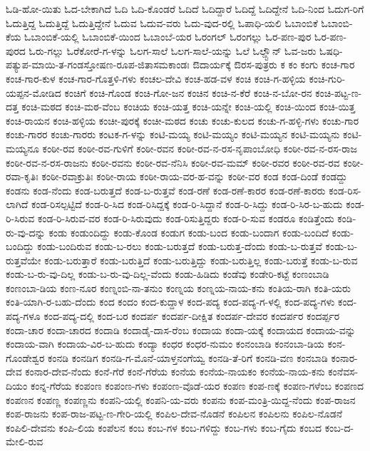 ಓಡಿ-ಹೋ-ಯಿತು
ಓದ-ಬೇಕಾಗಿದೆ
ಓದಿ
ಓದಿ-ಕೊಂಡರೆ
ಓದಿದೆ
ಓದಿದ್ದಾರೆ
ಓದಿದ್ದೆ
ಓದಿದ್ದೇನೆ
ಓದಿ-ನಿಂದ
ಓದುಗ-ರಿಗೆ
ಓದುತ್ತಿದ್ದ
ಓದುತ್ತಿದ್ದೆ
ಓದುತ್ತಿದ್ದೇನೆ
ಓದುವ
ಓದುವ-ವರು
ಓದು-ವುದ-ರಲ್ಲಿ
ಓಪಾಧಿ-ಯಲಿ
ಓಬಾಂಬಿಕೆ
ಓಬಾಂಬಿ-ಕೆಯ
ಓಬಾಂಬಿಕೆ-ಯಲ್ಲಿ
ಓಬಾಂಬಿಕೆ-ಯಿಂದ
ಓಬಾಂಬೆ-ಯರ
ಓರಂಗಲ್
ಓರಂಗಲ್ಲು
ಓರ-ಪಣ-ಪುರ
ಓರ-ಪಣ-ಪುರದ
ಓರು-ಗಲ್ಲು
ಓರೆಕೋರೆ-ಗ-ಳನ್ನು
ಓಲಗ-ಸಾಲೆ
ಓಲಗ-ಸಾಲೆ-ಯನ್ನು
ಓಲೆ
ಓಲ್ಡ್ಟೌನ್
ಓವ-ಜರು
ಓಷಧಿ-ಪತ್ಯುಪ-ಮಾಯಿ-ತ-ಗಂಡಸ್ತೋಷಣ-ರೂಪ-ಜಿತಾಸಮಕಾಂಡಃ
ಔದಾರ್ಯಕ್ಕೆ
ಔರಸ-ಪುತ್ರರು
ಕ
ಕಂ
ಕಂಗು
ಕಂಚ-ಗಾರ
ಕಂಚ-ಗಾರ-ಕುಳ
ಕಂಚ-ಗಾರ-ಗೊತ್ತಳಿ-ಗಳು
ಕಂಚಲ-ದೇವಿ
ಕಂಚ-ಹಡ-ವಳ
ಕಂಚಿ
ಕಂಚಿ-ಗ-ಹಳ್ಳಿಯ
ಕಂಚಿ-ಗುರಿ-ಯಪ್ಪನ-ಮೋಡಿದ
ಕಂಚಿಗೆ
ಕಂಚಿ-ಗೊಂಡ
ಕಂಚಿ-ಗೋ-ಜನ
ಕಂಚಿನ
ಕಂಚಿ-ನ-ಕೆರೆ
ಕಂಚಿ-ನ-ಬೋ-ರನ
ಕಂಚಿ-ಪಟ್ಟ-ಣ-ದತ್ತ
ಕಂಚಿ-ಮಠದ
ಕಂಚಿ-ಮಠ-ವೆಂಬ
ಕಂಚಿಯ
ಕಂಚಿ-ಯತ್ತ
ಕಂಚಿ-ಯನ್ನೇ
ಕಂಚಿ-ಯಲ್ಲಿ
ಕಂಚಿ-ಯಿಂದ
ಕಂಚಿ-ಯಿತ್ತ
ಕಂಚಿ-ರಾಯನ
ಕಂಚಿ-ಹಳ್ಳಿಯ
ಕಂಚೀ-ಪುರಕ್ಕೆ
ಕಂಚೀ-ಮಠದ
ಕಂಚು
ಕಂಚು-ಕುಲದ
ಕಂಚು-ಗ-ಹಳ್ಳಿ-ಗಳು
ಕಂಚು-ಗಾರ
ಕಂಚು-ಗಾರರ
ಕಂಚು-ಗಾರರು
ಕಂಟಕ-ಗ-ಳನ್ನು
ಕಂಟಿ-ಮಯ್ಯ
ಕಂಟಿ-ಮಯ್ಯಂ
ಕಂಟಿ-ಮಯ್ಯನ
ಕಂಟಿ-ಮಯ್ಯನು
ಕಂಟಿ-ಮಯ್ಯನೂ
ಕಂಠೀ-ರವ
ಕಂಠೀ-ರವ-ಗುಳಿಗೆ
ಕಂಠೀ-ರವನ
ಕಂಠೀ-ರವ-ನ-ರಸ-ನೃಪಾಂಬೋಧಿ
ಕಂಠೀ-ರವ-ನ-ರಸ-ರಾಜ
ಕಂಠೀ-ರವ-ನ-ರಸ-ರಾಜನು
ಕಂಠೀ-ರವನು
ಕಂಠೀ-ರವ-ನೆನಿಸಿ
ಕಂಠೀ-ರವ-ಮಮ್
ಕಂಠೀ-ರವರ
ಕಂಠೀ-ರವ-ರವ
ಕಂಠೀ-ರವಾ-ಕೃತಿಃ
ಕಂಠೀ-ರವಾಕ್ರುತಿಃ
ಕಂಠೀ-ರಾಯ
ಕಂಠೀ-ರಾಯ-ವರ-ಹ-ವನ್ನು
ಕಂಠೀ-ವರ
ಕಂಡ
ಕಂಡ-ದಿಂಡೆ
ಕಂಡದ್ದು
ಕಂಡನು
ಕಂಡ-ನೆಂದು
ಕಂಡ-ಬರುತ್ತದೆ
ಕಂಡ-ಬ-ರುತ್ತವೆ
ಕಂಡ-ರಣೆ
ಕಂಡ-ರಣೆ-ಕಾರರ
ಕಂಡ-ರಣೆ-ಕಾರರು
ಕಂಡ-ರಿಸ-ಲಾಗಿದೆ
ಕಂಡ-ರಿಸಲ್ಪಟ್ಟಿದೆ
ಕಂಡ-ರಿ-ಸಿದ
ಕಂಡ-ರಿಸಿದ್ದಕ್ಕೆ
ಕಂಡ-ರಿ-ಸಿದ್ದಾನೆ
ಕಂಡ-ರಿ-ಸಿದ್ದು
ಕಂಡ-ರಿ-ಸಿರ-ಬ-ಹುದು
ಕಂಡ-ರಿ-ಸಿರುವ
ಕಂಡ-ರಿ-ಸಿರುವ-ವರ
ಕಂಡ-ರಿ-ಸಿರುವುದು
ಕಂಡ-ರಿಸುತ್ತಿದ್ದರು
ಕಂಡ-ರಿ-ಸುವ
ಕಂಡರೂ
ಕಂಡಿತ್ತೆಂದು
ಕಂಡಿ-ರು-ವು-ದನ್ನು
ಕಂಡು
ಕಂಡುಂದಿದ್ದು
ಕಂಡು-ಕೊಂಡ
ಕಂಡುಗ
ಕಂಡು-ಬಂದ
ಕಂಡು-ಬಂದಾಗ
ಕಂಡು-ಬಂದಿದೆ
ಕಂಡು-ಬಂದಿದ್ದು
ಕಂಡು-ಬಂದಿರುವ
ಕಂಡು-ಬ-ರಲು
ಕಂಡು-ಬರುತ್ತದೆ
ಕಂಡು-ಬರುತ್ತ-ದೆಂದು
ಕಂಡು-ಬ-ರುತ್ತವೆ
ಕಂಡು-ಬ-ರುತ್ತವೆಯೇ
ಕಂಡು-ಬರುತ್ತಾರೆ
ಕಂಡು-ಬರುತ್ತಿದೆ
ಕಂಡು-ಬರುತ್ತಿದ್ದು
ಕಂಡು-ಬರುತ್ತಿಲ್ಲ
ಕಂಡು-ಬರುತ್ತೆ
ಕಂಡು-ಬ-ರುವ
ಕಂಡು-ಬ-ರು-ವು-ದಿಲ್ಲ
ಕಂಡು-ಬ-ರು-ವು-ದಿಲ್ಲ-ವೆಂದು
ಕಂಡು-ಹಿಡಿದು
ಕಂಡೆವು
ಕಂಡೇರಿ-ಕಟ್ಟೆ
ಕಂಣಂಬಾಡಿ
ಕಂಣಂಬಾ-ಡಿಯ
ಕಂಣ-ನೂರ
ಕಂಣ್ನಂಬಿ-ನಾ-ತನುಂ
ಕಂಣ್ನಯ
ಕಂಣ್ನಯ-ನಾಯ-ಕನು
ಕಂತಿಯ-ರಾಗಿ
ಕಂತಿ-ಯರು
ಕಂತಿ-ಯಾಗಿ-ರ-ಬಹು-ದೆಂದು
ಕಂದ
ಕಂದಂ
ಕಂದ-ಕುದ್ದಾಳ
ಕಂದ-ಪದ್ಯ
ಕಂದ-ಪದ್ಯ-ಗ-ಳಲ್ಲಿ
ಕಂದ-ಪದ್ಯ-ಗಳು
ಕಂದ-ಪದ್ಯ-ಗಳೂ
ಕಂದ-ಪದ್ಯ-ದಲ್ಲಿ
ಕಂದ-ಬರ
ಕಂದರ್ಪ
ಕಂದರ್ಪ-ದೀಕ್ಷಿತ
ಕಂದರ್ಪ-ದೇವರ
ಕಂದರ್ಪರ
ಕಂದರ್ಪ್ಪರ
ಕಂದಾ-ಚಾರ
ಕಂದಾ-ಚಾರದ
ಕಂದಾಡಿ
ಕಂದಾಡೈ-ದಾಸ-ರೆಂಬ
ಕಂದಾಯ
ಕಂದಾ-ಯಕ್ಕೆ
ಕಂದಾಯದ
ಕಂದಾಯ-ವನ್ನು
ಕಂದಾಯ-ವಾಗಿ
ಕಂದಾಯ-ವಿರ-ಬ-ಹುದು
ಕಂದ್ಯಾ
ಕಂಧರ
ಕಂಧರ-ನುಮಂ
ಕಂನಂಬಾಡಿ
ಕಂನಂಬಾ-ಡಿಯ
ಕಂನ-ಗೊಂಡೇಶ್ವರ
ಕಂನಡಿ
ಕಂನಡಿಗ
ಕಂನಡಿ-ಗ-ಮೊನೆ-ಯಾಳ್ತನಂಗೆಯ್ವ
ಕಂನಡಿ-ತೆ-ರಿಗೆ
ಕಂನಡಿ-ವಣ
ಕಂನಬಾಡಿ
ಕಂನಾರ-ದೇವ
ಕಂನಾರ-ದೇವ-ನೆಂದು
ಕಂನೆ-ಗೆರೆ
ಕಂನೆ-ಗೆರೆಯ
ಕಂನೆಯ
ಕಂನೆಯ-ನಾಯಕಂ
ಕಂನೆಯ-ನಾಯ-ಕನು
ಕಂನೆವಸ-ದಿಯಂ
ಕಂನ್ನ-ಗೆರೆಯ
ಕಂಪಂಣ
ಕಂಪಂಣ-ಗಳು
ಕಂಪಂಣ-ವೊಡೆ-ಯರ
ಕಂಪಣ
ಕಂಪ-ಣಕ್ಕೆ
ಕಂಪಣ-ಗಳೆಂಬ
ಕಂಪಣದ
ಕಂಪಣನ
ಕಂಪಣ್ಣ
ಕಂಪಣ್ಣನು
ಕಂಪನಿ-ಯಲ್ಲಿ
ಕಂಪನಿ-ಯ-ವರು
ಕಂಪನು
ಕಂಪ-ಮಂತ್ರಿ-ಯಿದ್ದ-ನೆಂದು
ಕಂಪ-ರಾಜನ
ಕಂಪ-ರಾಜನು
ಕಂಪ-ರಾಜ-ಪಟ್ಟ-ಣ-ಗೇರಿ-ಯಲ್ಲಿ
ಕಂಪಿಲ-ದೇವ-ನೊಡನೆ
ಕಂಪಿಲನ
ಕಂಪಿಲನು
ಕಂಪಿಲ-ನೊಡನೆ
ಕಂಪಿಲಿ-ದೇವನು
ಕಂಪಿ-ಲಿಯ
ಕಂಪೆಲನ
ಕಂಬ
ಕಂಬ-ಗಳ
ಕಂಬ-ಗಳಿದ್ದು
ಕಂಬ-ಗಳು
ಕಂಬ-ಗೈದು
ಕಂಬದ
ಕಂಬ-ದ-ಮೇಲಿ-ರುವ

